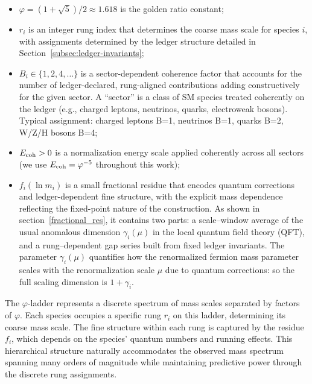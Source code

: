 \documentclass[%
amsmath,amssymb,
aps,
prb,
floatfix, showkeys, 10pt,
]{revtex4-2}
\begin{document}
\begin{itemize}
\item $\varphi = (1+\sqrt{5})/2 \approx 1.618$ is the golden ratio constant;

\item $r_i$ is an integer rung index that determines the coarse mass scale for species $i$, with assignments determined by the ledger structure detailed in Section~\ref{subsec:ledger-invariants};

\item $B_i \in \{1, 2, 4, \ldots\}$ is a sector-dependent coherence factor that accounts for the number of ledger-declared, rung-aligned contributions adding constructively for the given sector.
 A “sector” is a class of SM species treated coherently on the ledger (e.g., charged leptons, neutrinos, quarks, electroweak bosons). Typical assignment: charged leptons B=1, neutrinos B=1, quarks B=2, W/Z/H bosons B=4;

\item $E_{\rm coh} > 0$ is a normalization energy scale applied coherently across all sectors (we use $E_{\rm coh} = \varphi^{-5}$ throughout this work);

\item $f_i(\ln m_i)$ is a small fractional residue that encodes quantum corrections and ledger-dependent fine structure, with the explicit mass dependence reflecting the fixed-point nature of the construction.
  As shown in section~\ref{fractional_res}, it contains two parts:  a scale–window average
  of the usual anomalous dimension $\gamma_i(\mu)$ in the
     local quantum field theory (QFT), and  a rung–dependent gap series built from fixed ledger invariants.
  The parameter  $\gamma_i(\mu)$ quantifies how the renormalized fermion mass parameter scales with the
renormalization scale $\mu$ due to quantum corrections: so the full scaling dimension is $1 + \gamma_i$.

\end{itemize}

The $\varphi$-ladder represents a discrete spectrum of mass scales separated by
factors of $\varphi$. Each species occupies a specific rung $r_i$ on this
ladder, determining its coarse mass scale. The fine structure within each rung
is captured by the residue $f_i$, which depends on the species' quantum numbers
and running effects. This hierarchical structure naturally accommodates the
observed mass spectrum spanning many orders of magnitude while maintaining
predictive power through the discrete rung assignments.
\end{document}
